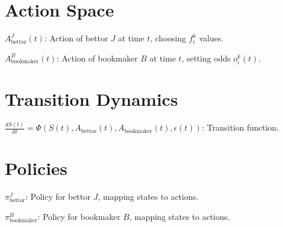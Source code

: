 \section{Action Space}

\item \( A_{\text{bettor}}^J(t) \): Action of bettor \( J \) at time \( t \), choosing \( f_i^k \) values.
\item \( A_{\text{bookmaker}}^B(t) \): Action of bookmaker \( B \) at time \( t \), setting odds \( o_i^k(t) \).

\section{Transition Dynamics}

\item \( \frac{dS(t)}{dt} = \Phi\left( S(t), A_{\text{bettor}}(t), A_{\text{bookmaker}}(t), \epsilon(t) \right) \): Transition function.

\section{Policies}

\item \( \pi_{\text{bettor}}^J \): Policy for bettor \( J \), mapping states to actions.
\item \( \pi_{\text{bookmaker}}^B \): Policy for bookmaker \( B \), mapping states to actions.
